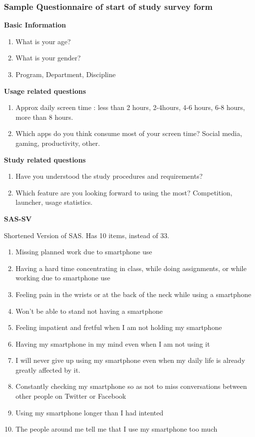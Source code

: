 \documentclass{article}
\begin{document}
\subsubsection{Sample Questionnaire of start of study survey form}

\textbf{Basic Information}
\begin{enumerate}
    \item What is your age?
    \item What is your gender?
    \item Program, Department, Discipline
\end{enumerate}

\textbf{Usage related questions}
\begin{enumerate}
    \item Approx daily screen time : less than 2 hours, 2-4hours, 4-6 hours, 6-8 hours, more than 8 hours.
    \item Which apps do you think consume most of your screen time? Social media, gaming, productivity, other. 
\end{enumerate}

\textbf{Study related questions}
\begin{enumerate}
    \item Have you understood the study procedures and requirements?
    \item Which feature are you looking forward to using the most? Competition, launcher, usage statistics.
\end{enumerate}


\textbf{SAS-SV}

Shortened Version of SAS. Has 10 items, instead of 33. 

\begin{enumerate}
        \item Missing planned work due to smartphone use
        \item Having a hard time concentrating in class, while doing assignments, or while working due to smartphone use
        \item Feeling pain in the wrists or at the back of the neck while using a smartphone
        \item Won't be able to stand not having a smartphone
        \item Feeling impatient and fretful when I am not holding my smartphone
        \item Having my smartphone in my mind even when I am not using it
        \item I will never give up using my smartphone even when my daily life is already greatly affected by it.
        \item Constantly checking my smartphone so as not to miss conversations between other people on Twitter or Facebook
        \item Using my smartphone longer than I had intented
        \item The people around me tell me that I use my smartphone too much
\end{enumerate}
\end{document}
